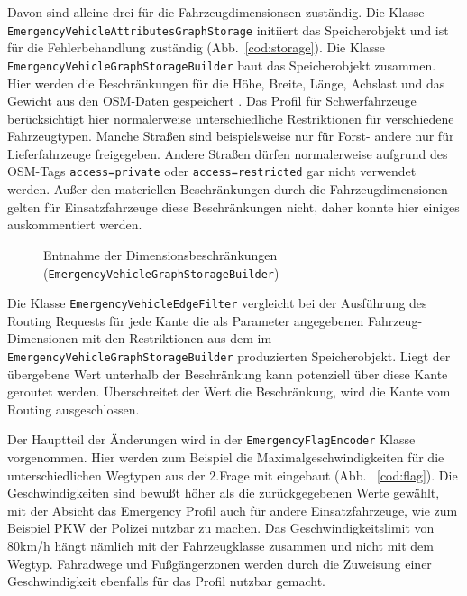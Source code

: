 \documentclass[12pt,a4paper]{article}
\begin{document}
Davon sind alleine drei für die Fahrzeugdimensionsen zuständig.
Die Klasse \lstinline!EmergencyVehicleAttributesGraphStorage! initiiert das Speicherobjekt und ist für die Fehlerbehandlung zuständig (Abb.~\ref{cod:storage}).
Die Klasse \lstinline!EmergencyVehicleGraphStorageBuilder! baut das Speicherobjekt zusammen. Hier werden die Beschränkungen für die Höhe, Breite, Länge, Achslast und das Gewicht aus den OSM-Daten gespeichert . Das Profil für Schwerfahrzeuge berücksichtigt hier normalerweise unterschiedliche Restriktionen für verschiedene Fahrzeugtypen. Manche Straßen sind beispielsweise nur für Forst- andere nur für Lieferfahrzeuge freigegeben. Andere Straßen dürfen normalerweise aufgrund des OSM-Tags \lstinline!access=private! oder \lstinline!access=restricted! gar nicht verwendet werden. Außer den materiellen Beschränkungen durch die Fahrzeugdimensionen gelten für Einsatzfahrzeuge diese Beschränkungen nicht, daher konnte hier einiges auskommentiert werden.

\begin{figure}[h]

\caption{Entnahme der Dimensionsbeschränkungen (\lstinline!EmergencyVehicleGraphStorageBuilder!)}
\label{cod:builder}
\end{figure}

Die Klasse \lstinline!EmergencyVehicleEdgeFilter! vergleicht bei der Ausführung des Routing Requests für jede Kante die als Parameter angegebenen Fahrzeug-Dimensionen mit den Restriktionen aus dem im \lstinline!EmergencyVehicleGraphStorageBuilder! produzierten Speicherobjekt. Liegt der übergebene Wert unterhalb der Beschränkung kann potenziell über diese Kante geroutet werden. Überschreitet der Wert die Beschränkung, wird die Kante vom Routing ausgeschlossen.

Der Hauptteil der Änderungen wird in der \lstinline!EmergencyFlagEncoder! Klasse vorgenommen. Hier werden zum Beispiel die Maximalgeschwindigkeiten für die unterschiedlichen Wegtypen aus der 2.Frage mit eingebaut (Abb. ~\ref{cod:flag}). Die Geschwindigkeiten sind bewußt höher als die zurückgegebenen Werte gewählt, mit der Absicht das Emergency Profil auch für andere Einsatzfahrzeuge, wie zum Beispiel PKW der Polizei nutzbar zu machen. Das Geschwindigkeitslimit von 80km/h hängt nämlich mit der Fahrzeugklasse zusammen und nicht mit dem Wegtyp. Fahradwege und Fußgängerzonen werden durch die Zuweisung einer Geschwindigkeit ebenfalls für das Profil nutzbar gemacht. 
\end{document}
